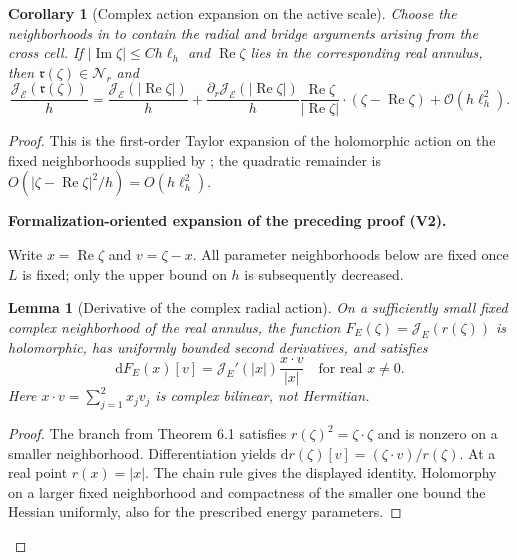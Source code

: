 \documentclass[11pt]{article}
\newtheorem{lemma}[theorem]{Lemma}
\newtheorem{corollary}[theorem]{Corollary}
\newcommand{\formalisationparentid}{X}
\newenvironment{formalisationaddition}[1]{\par\medskip\begingroup\color{blue}\def\formalisationparentid{#1}\setcounter{formalizationsublemma}{0}\let\lemma\formalizationsublemma\let\endlemma\endformalizationsublemma
  \def\Eo{\mathcal E_h^\circ}\def\EE{\mathcal E_h}\def\phio{\phi_h^\circ}\def\phih{\phi_h}\def\Ho{H_h^{\rm atom}(v^\circ)}\def\Ha{H_h^{\rm atom}}\def\HL{H_h^{L}}\def\Dh{D_h}\def\Log{\operatorname{Log}}\def\ellh{\ell_h}\def\Gp{G_{p,h}}\def\Ast{A_{*,h}}\def\ahat{\widehat{\mathfrak a}_h}\def\ah{\mathfrak a_h}\def\rh{\widehat\rho_h}\def\deltah{\widehat\delta_h}\def\oldref##1{\textup{(##1)}}\def\interface##1{\par\noindent\textit{Analytical interface used here.} ##1\par}\def\finish{\par\noindent\textit{Conclusion of the formalization-oriented expansion.} }\par\noindent\textbf{Formalization-oriented expansion of the preceding proof (V2).}\par\smallskip
}{\par\endgroup\medskip
}
\newcommand{\cE}{\mathcal E}
\newcommand{\cJ}{\mathcal J}
\newcommand{\cO}{\mathcal O}
\newcommand{\Rea}{\operatorname{Re}}
\newcommand{\Ima}{\operatorname{Im}}
\begin{document}
\begin{corollary}[Complex action expansion on the active scale]
\label{cor:complex-action-active}
Choose the neighborhoods in  to contain the
radial and bridge arguments arising from the cross cell.  If
$|\Ima\zeta|\le Ch\ell_h$ and $\Rea\zeta$ lies in the corresponding real
annulus, then $\mathfrak r(\zeta)\in\mathcal N_r$ and
\begin{equation}\label{eq:complex-action-split-new}
 \frac{\cJ_\cE(\mathfrak r(\zeta))}{h}
 =\frac{\cJ_\cE(|\Rea\zeta|)}h
 +\frac{\partial_r\cJ_\cE(|\Rea\zeta|)}h
  \frac{\Rea\zeta}{|\Rea\zeta|}\cdot
  (\zeta-\Rea\zeta)
 +\cO(h\ell_h^2).
\end{equation}
\end{corollary}

\begin{proof}
This is the first-order Taylor expansion of the holomorphic action on the
fixed neighborhoods supplied by ; the
quadratic remainder is $O(|\zeta-\Rea\zeta|^2/h)=O(h\ell_h^2)$.

\begin{formalisationaddition}{C6.2}
Write $x=\Rea\zeta$ and $v=\zeta-x$. All parameter neighborhoods below are fixed once $L$ is fixed; only the upper bound on $h$ is subsequently decreased.

\begin{lemma}[Derivative of the complex radial action]\label{sublemma:C6-2-derivative}
On a sufficiently small fixed complex neighborhood of the real annulus, the function $F_E(\zeta)=\cJ_E(r(\zeta))$ is holomorphic, has uniformly bounded second derivatives, and satisfies
\[
 \mathrm dF_E(x)[v]=\cJ_E'(|x|)\frac{x\cdot v}{|x|}
 \quad\text{for real }x\ne0.
\]
Here $x\cdot v=\sum_{j=1}^2x_jv_j$ is complex bilinear, not Hermitian.
\end{lemma}
\begin{proof}
The branch from Theorem 6.1 satisfies $r(\zeta)^2=\zeta\cdot\zeta$ and is nonzero on a smaller neighborhood. Differentiation yields $\mathrm dr(\zeta)[v]=(\zeta\cdot v)/r(\zeta)$. At a real point $r(x)=|x|$. The chain rule gives the displayed identity. Holomorphy on a larger fixed neighborhood and compactness of the smaller one bound the Hessian uniformly, also for the prescribed energy parameters.
\end{proof}


\end{formalisationaddition}
\end{proof}
\end{document}
